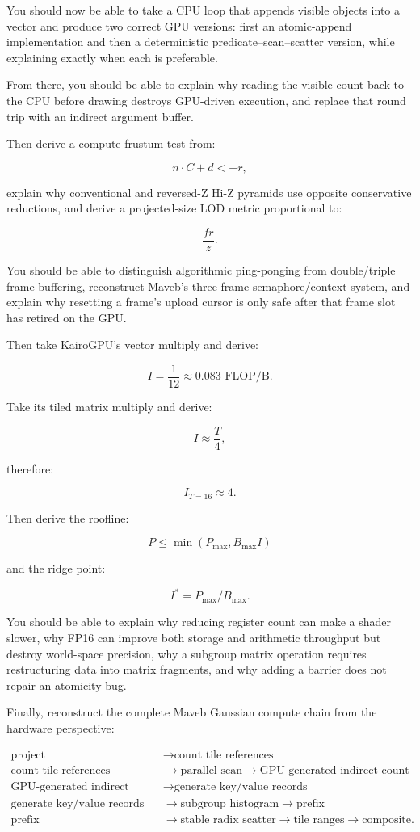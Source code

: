 You should now be able to take a CPU loop that appends visible objects into a vector and produce two correct GPU versions: first an atomic-append implementation and then a deterministic predicate--scan--scatter version, while explaining exactly when each is preferable.

From there, you should be able to explain why reading the visible count back to the CPU before drawing destroys GPU-driven execution, and replace that round trip with an indirect argument buffer.

Then derive a compute frustum test from:

\[
n\cdot C+d<-r,
\]

explain why conventional and reversed-Z Hi-Z pyramids use opposite conservative reductions, and derive a projected-size LOD metric proportional to:

\[
\frac{fr}{z}.
\]

You should be able to distinguish algorithmic ping-ponging from double/triple frame buffering, reconstruct Maveb's three-frame semaphore/context system, and explain why resetting a frame's upload cursor is only safe after that frame slot has retired on the GPU.

Then take KairoGPU's vector multiply and derive:

\[
I=
\frac1{12}
\approx0.083
\text{ FLOP/B}.
\]

Take its tiled matrix multiply and derive:

\[
I\approx\frac T4,
\]

therefore:

\[
I_{T=16}\approx4.
\]

Then derive the roofline:

\[
\boxed{
P
\le
\min(
P_{\max},
B_{\max}I
)
}
\]

and the ridge point:

\[
\boxed{
I^*=
P_{\max}/B_{\max}.
}
\]

You should be able to explain why reducing register count can make a shader slower, why FP16 can improve both storage and arithmetic throughput but destroy world-space precision, why a subgroup matrix operation requires restructuring data into matrix fragments, and why adding a barrier does not repair an atomicity bug.

Finally, reconstruct the complete Maveb Gaussian compute chain from the hardware perspective:

\[\begin{aligned}\text{project} &\rightarrow \text{count tile references}\\\text{count tile references} &\rightarrow \text{parallel scan} \rightarrow \text{GPU-generated indirect count}\\\text{GPU-generated indirect count} &\rightarrow \text{generate key/value records}\\\text{generate key/value records} &\rightarrow \text{subgroup histogram} \rightarrow \text{prefix}\\\text{prefix} &\rightarrow \text{stable radix scatter} \rightarrow \text{tile ranges} \rightarrow \text{composite}.\end{aligned}\]

